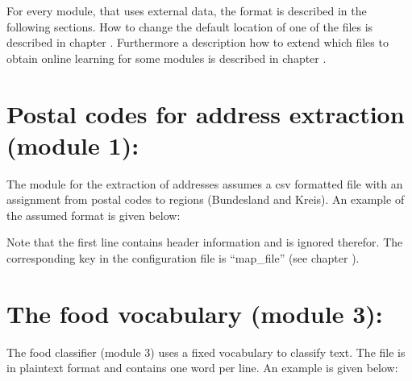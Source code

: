 \documentclass[letterpaper,10pt,english]{sphinxmanual}
\begin{document}
For every module, that uses external data, the format is described in
the following sections. How to change the default location of one of
the files is described in chapter {\hyperref[\detokenize{configuration:configuration}]{}}. Furthermore a
description how to extend which files to obtain online learning for
some modules is described in chapter {\hyperref[\detokenize{online_learning:online}]{}}.


\section{Postal codes for address extraction (module 1):}
\label{\detokenize{external_data:external-postal-code}}\label{\detokenize{external_data:postal-codes-for-address-extraction-module-1}}
The module for the extraction of addresses assumes a csv formatted
file with an assignment from postal codes to regions (Bundesland and
Kreis). An example of the assumed format is given below:

%
\begin{sphinxVerbatim}[commandchars=\\\{\}]
\end{sphinxVerbatim}

Note that the first line contains header information and is ignored
therefor. The corresponding key in the configuration file is
“map\_file” (see chapter {\hyperref[\detokenize{configuration:configuration}]{}}).


\section{The food vocabulary (module 3):}
\label{\detokenize{external_data:external-food-vocab}}\label{\detokenize{external_data:the-food-vocabulary-module-3}}
The food classifier (module 3) uses a fixed vocabulary to classify
text. The file is in plaintext format and contains one word per
line. An example is given below:

%
\begin{sphinxVerbatim}[commandchars=\\\{\}]
\end{sphinxVerbatim}
\end{document}
